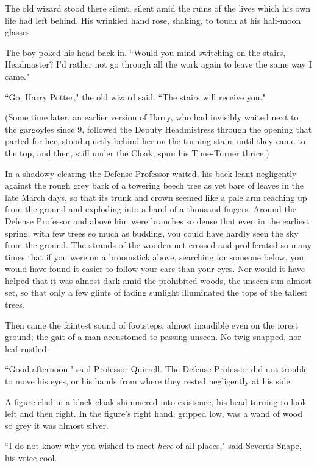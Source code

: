 The old wizard stood there silent, silent amid the ruins of the lives which his own life had left behind. His wrinkled hand rose, shaking, to touch at his half-moon glasses\---

The boy poked his head back in. ``Would you mind switching on the stairs, Headmaster? I'd rather not go through all the work again to leave the same way I came."

``Go, Harry Potter," the old wizard said. ``The stairs will receive you."

(Some time later, an earlier version of Harry, who had invisibly waited next to the gargoyles since 9\pm, followed the Deputy Headmistress through the opening that parted for her, stood quietly behind her on the turning stairs until they came to the top, and then, still under the Cloak, spun his Time-Turner thrice.)


In a shadowy clearing the Defense Professor waited, his back leant negligently against the rough grey bark of a towering beech tree as yet bare of leaves in the late March days, so that its trunk and crown seemed like a pale arm reaching up from the ground and exploding into a hand of a thousand fingers. Around the Defense Professor and above him were branches so dense that even in the earliest spring, with few trees so much as budding, you could have hardly seen the sky from the ground. The strands of the wooden net crossed and proliferated so many times that if you were on a broomstick above, searching for someone below, you would have found it easier to follow your ears than your eyes. Nor would it have helped that it was almost dark amid the prohibited woods, the unseen sun almost set, so that only a few glints of fading sunlight illuminated the tops of the tallest trees.

Then came the faintest sound of footsteps, almost inaudible even on the forest ground; the gait of a man accustomed to passing unseen. No twig snapped, nor leaf rustled\---

``Good afternoon," said Professor Quirrell. The Defense Professor did not trouble to move his eyes, or his hands from where they rested negligently at his side.

A figure clad in a black cloak shimmered into existence, his head turning to look left and then right. In the figure's right hand, gripped low, was a wand of wood so grey it was almost silver.

``I do not know why you wished to meet \emph{here} of all places," said Severus Snape, his voice cool.

